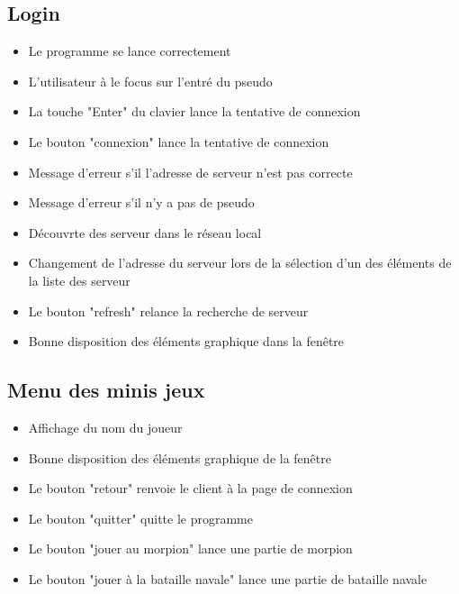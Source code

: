 \documentclass{report}
\begin{document}
\subsection{Login}
\begin{itemize}
  \item Le programme se lance correctement
  \item L'utilisateur à le focus sur l'entré du pseudo
  \item La touche "Enter" du clavier lance la tentative de connexion
  \item Le bouton "connexion" lance la tentative de connexion
  \item Message d'erreur s'il l'adresse de  serveur n'est pas correcte
  \item Message d'erreur s'il n'y a pas de pseudo
  \item Découvrte des serveur dans le réseau local
  \item Changement de l'adresse du serveur lors de la sélection d'un des éléments de la liste des serveur
  \item Le bouton "refresh" relance la recherche de serveur
  \item Bonne disposition des éléments graphique dans la fenêtre

\end{itemize}

\subsection{Menu des minis jeux}
\begin{itemize}
  \item Affichage du nom du joueur
  \item Bonne disposition des éléments graphique de la fenêtre
  \item Le bouton "retour" renvoie le client à la page de connexion
  \item Le bouton "quitter" quitte le programme
  \item Le bouton "jouer au morpion" lance une partie de morpion
  \item Le bouton "jouer à la bataille navale" lance une partie de bataille navale
\end{itemize}
\end{document}
